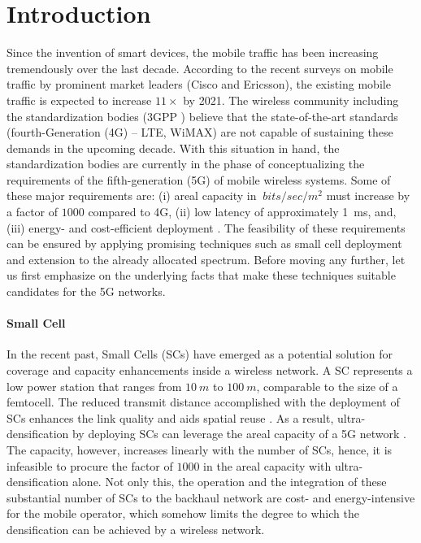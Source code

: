 \chapter{Introduction}

Since the invention of smart devices, the mobile traffic has been increasing tremendously over the last decade. According to the recent surveys on mobile traffic by prominent market leaders (Cisco \cite{CISCO14} and Ericsson\cite{Eric15}), the existing mobile traffic is expected to increase $11 \times$ by 2021. The wireless community including the standardization bodies (3GPP \cite{3GPP}) believe that the state-of-the-art standards (fourth-Generation (4G) -- LTE, WiMAX) are not capable of sustaining these demands in the upcoming decade. With this situation in hand, the standardization bodies are currently in the phase of conceptualizing the requirements of the fifth-generation (5G) of mobile wireless systems.
Some of these major requirements are: (i) areal capacity in $\SI{}{bits/sec/m^2}$ must increase by a factor of $1000$ compared to 4G, (ii) low latency of approximately \SI{1}{ms}, and, (iii) energy- and cost-efficient deployment \cite{Qual13, Andrews14}.
The feasibility of these requirements can be ensured by applying promising techniques such as small cell deployment and extension to the already allocated spectrum. Before moving any further, let us first emphasize on the underlying facts that make these techniques suitable candidates for the 5G networks. 

\subsubsection*{Small Cell}

In the recent past, Small Cells (SCs) have emerged as a potential solution for coverage and capacity enhancements inside a wireless network. A SC represents a low power station that ranges from $\SI{10}{m}$ to $\SI{100}{m}$, comparable to the size of a femtocell. The reduced transmit distance accomplished with the deployment of SCs enhances the link quality and aids spatial reuse \cite{Chander08}.
As a result, ultra-densification by deploying SCs can leverage the areal capacity of a 5G network \cite{Andrews14}. The capacity, however, increases linearly with the number of SCs, hence, it is infeasible to procure the factor of $1000$ in the areal capacity with ultra-densification alone. Not only this, the operation and the integration of these substantial number of SCs to the backhaul network are cost- and energy-intensive for the mobile operator, which somehow limits the degree to which the densification can be achieved by a wireless network.





